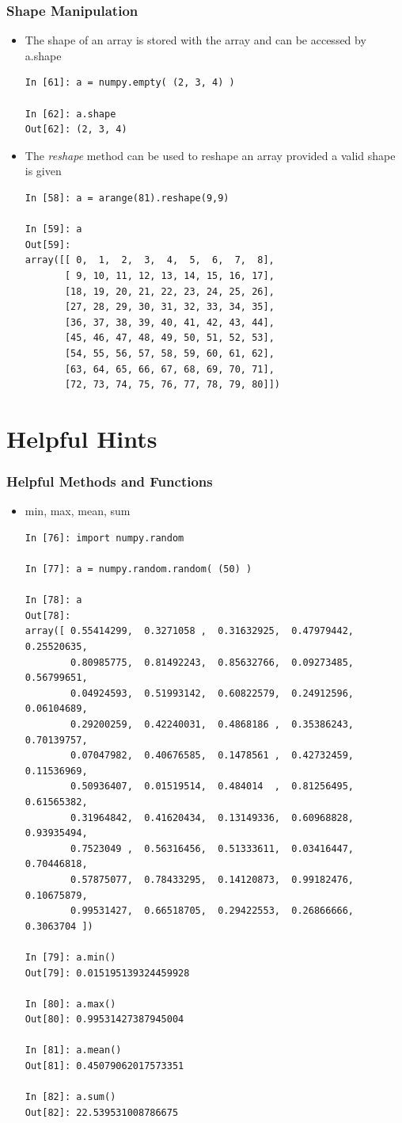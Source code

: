 \documentclass{beamer}
\begin{document}
\begin{frame}[fragile]
\frametitle{Shape Manipulation}
  \begin{itemize}
    \item{The shape of an array is stored with the array and can be accessed by a.shape}
    \begin{lstlisting}
In [61]: a = numpy.empty( (2, 3, 4) )

In [62]: a.shape
Out[62]: (2, 3, 4)
    \end{lstlisting}
    \item{The \emph{reshape} method can be used to reshape an array provided a valid shape is given}
    \begin{lstlisting}
In [58]: a = arange(81).reshape(9,9)

In [59]: a
Out[59]:
array([[ 0,  1,  2,  3,  4,  5,  6,  7,  8],
       [ 9, 10, 11, 12, 13, 14, 15, 16, 17],
       [18, 19, 20, 21, 22, 23, 24, 25, 26],
       [27, 28, 29, 30, 31, 32, 33, 34, 35],
       [36, 37, 38, 39, 40, 41, 42, 43, 44],
       [45, 46, 47, 48, 49, 50, 51, 52, 53],
       [54, 55, 56, 57, 58, 59, 60, 61, 62],
       [63, 64, 65, 66, 67, 68, 69, 70, 71],
       [72, 73, 74, 75, 76, 77, 78, 79, 80]])
    \end{lstlisting}
  \end{itemize}
\end{frame}

\section{Helpful Hints}
\begin{frame}[fragile]
\frametitle{Helpful Methods and Functions}
  \begin{itemize}
    \item{min, max, mean, sum}
    \begin{lstlisting}
In [76]: import numpy.random

In [77]: a = numpy.random.random( (50) )

In [78]: a
Out[78]:
array([ 0.55414299,  0.3271058 ,  0.31632925,  0.47979442,  0.25520635,
        0.80985775,  0.81492243,  0.85632766,  0.09273485,  0.56799651,
        0.04924593,  0.51993142,  0.60822579,  0.24912596,  0.06104689,
        0.29200259,  0.42240031,  0.4868186 ,  0.35386243,  0.70139757,
        0.07047982,  0.40676585,  0.1478561 ,  0.42732459,  0.11536969,
        0.50936407,  0.01519514,  0.484014  ,  0.81256495,  0.61565382,
        0.31964842,  0.41620434,  0.13149336,  0.60968828,  0.93935494,
        0.7523049 ,  0.56316456,  0.51333611,  0.03416447,  0.70446818,
        0.57875077,  0.78433295,  0.14120873,  0.99182476,  0.10675879,
        0.99531427,  0.66518705,  0.29422553,  0.26866666,  0.3063704 ])

In [79]: a.min()
Out[79]: 0.015195139324459928

In [80]: a.max()
Out[80]: 0.99531427387945004

In [81]: a.mean()
Out[81]: 0.45079062017573351

In [82]: a.sum()
Out[82]: 22.539531008786675
    \end{lstlisting}
  \end{itemize}
\end{frame}
\end{document}
